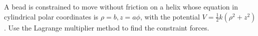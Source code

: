 \documentclass[../main.tex]{subfiles}
\begin{document}
\begin{problema}
	A bead is constrained to move without friction on a helix whose equation
	in cylindrical polar coordinates is \(\rho = b, z = a\phi\), with
	the potential \( V = \tfrac{1}{2}k(\rho^{2} + z^{2})\). Use the
	Lagrange multiplier method to find the constraint forces.
\end{problema}
\end{document}
